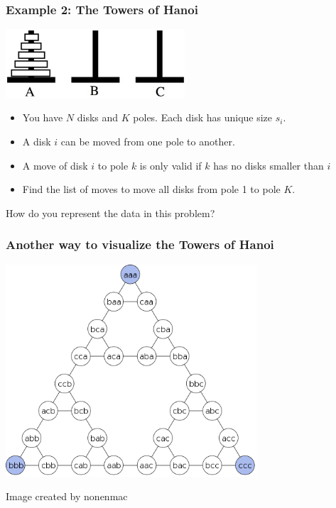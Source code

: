 \documentclass{beamer}
\begin{document}
\begin{frame}
  \frametitle{Example 2: The Towers of Hanoi}
  
  \begin{center}
    \includegraphics[width=0.5\textwidth]{img/hanoi}
  \end{center}
  \medskip

  {\small
    \begin{itemize}
    \item You have $N$ disks and $K$ poles. Each disk has unique size $s_i$.
    \item A disk $i$ can be moved from one pole to another.
    \item A move of disk $i$ to pole $k$ is only valid if $k$ has no disks smaller than $i$
    \item Find the list of moves to move all disks from pole 1 to pole $K$.
    \end{itemize}
  }
  
  \vfill

  How do you represent the data in this problem?
\end{frame}

\begin{frame}
  \frametitle{Another way to visualize the Towers of Hanoi}
  \begin{center}
    \includegraphics[width=0.7\textwidth]{img/hanoi_graph}
  \end{center}
  {\tiny \hfill Image created by nonenmac}
\end{frame}
\end{document}
